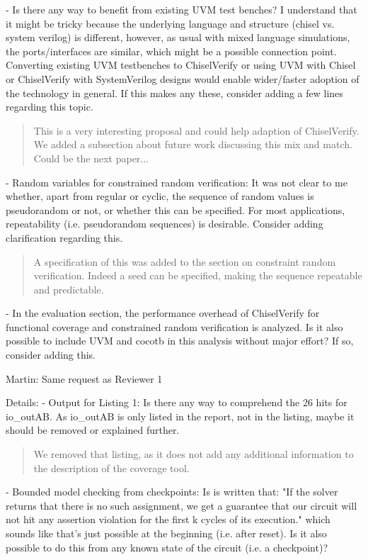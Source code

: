 \documentclass{article}
\newcommand{\martin}[1]{{\color{blue} Martin: #1\\}}
\newcommand{\reply}[1]{{\color{blue} #1}}
\begin{document}
- Is there any way to benefit from existing UVM test benches? I understand that it might be tricky because the underlying language and structure (chisel vs. system verilog) is different, however, as usual with mixed language simulations, the ports/interfaces are similar, which might be a possible connection point. Converting existing UVM testbenches to ChiselVerify or using UVM with Chisel or ChiselVerify with SystemVerilog designs would enable wider/faster adoption of the technology in general. If this makes any these, consider adding a few lines regarding this topic.

\begin{quote}
\reply{This is a very interesting proposal and could help adaption of ChiselVerify. We added a subsection about future work
discussing this mix and match. Could be the next paper...}
\end{quote}


- Random variables for constrained random verification: It was not clear to me whether, apart from regular or cyclic, the sequence of random values is pseudorandom or not, or whether this can be specified. For most applications, repeatability (i.e. pseudorandom sequences) is desirable. Consider adding clarification regarding this.

\begin{quote}
\reply{A specification of this was added to the section on constraint random verification. Indeed a seed can be specified, making the sequence repeatable and predictable.}
\end{quote}

- In the evaluation section, the performance overhead of ChiselVerify for functional coverage and constrained random verification is analyzed. Is it also possible to include UVM and cocotb in this analysis without major effort? If so, consider adding this.

\martin{Same request as Reviewer 1}

Details:
- Output for Listing 1: Is there any way to comprehend the 26 hits for io\_outAB. As io\_outAB is only listed in the report, not in the listing, maybe it should be removed or explained further.

\begin{quote}
\reply{We removed that listing, as it does not add any additional information to the description of the coverage tool.}
\end{quote}

- Bounded model checking from checkpoints: Is is written that: "If the solver returns that there is no such assignment, we get a guarantee that our circuit will not hit any assertion violation for the first k cycles of its execution." which sounds like that's just possible at the beginning (i.e. after reset). Is it also possible to do this from any known state of the circuit (i.e. a checkpoint)?
\end{document}
